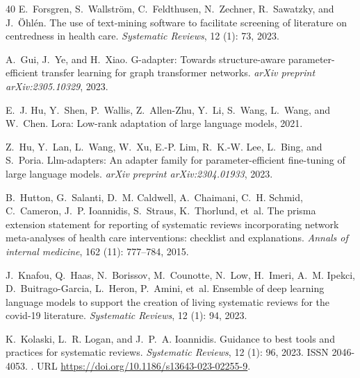 \documentclass{article}
\begin{document}
\begin{thebibliography}{40}
E.~Forsgren, S.~Wallstr{\"o}m, C.~Feldthusen, N.~Zechner, R.~Sawatzky, and
  J.~{\"O}hl{\'e}n.
\newblock The use of text-mining software to facilitate screening of literature
  on centredness in health care.
\newblock \emph{Systematic Reviews}, 12 (1): 73, 2023.

A.~Gui, J.~Ye, and H.~Xiao.
\newblock G-adapter: Towards structure-aware parameter-efficient transfer
  learning for graph transformer networks.
\newblock \emph{arXiv preprint arXiv:2305.10329}, 2023.

E.~J. Hu, Y.~Shen, P.~Wallis, Z.~Allen-Zhu, Y.~Li, S.~Wang, L.~Wang, and
  W.~Chen.
\newblock Lora: Low-rank adaptation of large language models, 2021.

Z.~Hu, Y.~Lan, L.~Wang, W.~Xu, E.-P. Lim, R.~K.-W. Lee, L.~Bing, and S.~Poria.
\newblock Llm-adapters: An adapter family for parameter-efficient fine-tuning
  of large language models.
\newblock \emph{arXiv preprint arXiv:2304.01933}, 2023.

B.~Hutton, G.~Salanti, D.~M. Caldwell, A.~Chaimani, C.~H. Schmid, C.~Cameron,
  J.~P. Ioannidis, S.~Straus, K.~Thorlund, et~al.
\newblock The prisma extension statement for reporting of systematic reviews
  incorporating network meta-analyses of health care interventions: checklist
  and explanations.
\newblock \emph{Annals of internal medicine}, 162 (11):
  777--784, 2015.

J.~Knafou, Q.~Haas, N.~Borissov, M.~Counotte, N.~Low, H.~Imeri, A.~M. Ipekci,
  D.~Buitrago-Garcia, L.~Heron, P.~Amini, et~al.
\newblock Ensemble of deep learning language models to support the creation of
  living systematic reviews for the covid-19 literature.
\newblock \emph{Systematic Reviews}, 12 (1): 94, 2023.

K.~Kolaski, L.~R. Logan, and J.~P.~A. Ioannidis.
\newblock Guidance to best tools and practices for systematic reviews.
\newblock \emph{Systematic Reviews}, 12 (1): 96, 2023.
\newblock ISSN 2046-4053.
\newblock {}.
\newblock URL \url{https://doi.org/10.1186/s13643-023-02255-9}.


\end{thebibliography}
\end{document}
